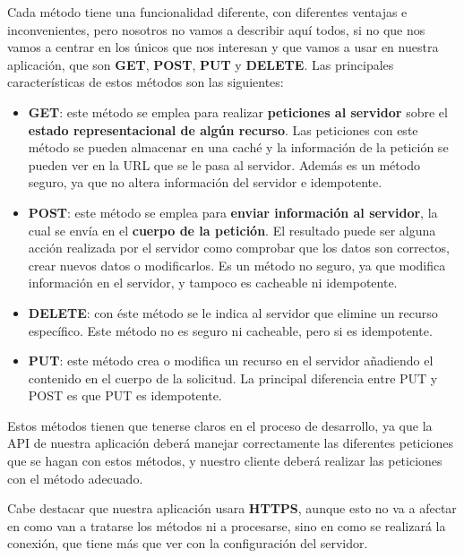 Cada método tiene una funcionalidad diferente, con diferentes ventajas e inconvenientes, pero nosotros no vamos a describir aquí todos, si no que nos vamos a centrar en los únicos que nos interesan y que vamos a usar en nuestra aplicación, que son \textbf{GET}, \textbf{POST}, \textbf{PUT} y \textbf{DELETE}. Las principales características de estos métodos son las siguientes:

\begin{itemize}
	\item \textbf{GET}: este método se emplea para realizar \textbf{peticiones al servidor} sobre el \textbf{estado representacional de algún recurso}. Las peticiones con este método se pueden almacenar en una caché y la información de la petición se pueden ver en la URL que se le pasa al servidor. Además es un método seguro, ya que no altera información del servidor e \gls{idempotente}. \cite{mdn02}
	
	\item \textbf{POST}: este método se emplea para \textbf{enviar información al servidor}, la cual se envía en el \textbf{cuerpo de la petición}. El resultado puede ser alguna acción realizada por el servidor como comprobar que los datos son correctos, crear nuevos datos o modificarlos. Es un método no seguro, ya que modifica información en el servidor, y tampoco es cacheable ni idempotente. \cite{mdn03} 
	
	\item \textbf{DELETE}: con éste método se le indica al servidor que elimine un recurso específico. Este método no es seguro ni cacheable, pero si es idempotente. \cite{mdn04}
	
	\item \textbf{PUT}: este método crea o modifica un recurso en el servidor añadiendo el contenido en el cuerpo de la solicitud. La principal diferencia entre PUT y POST es que PUT es idempotente. \cite{mdn05}
\end{itemize}

Estos métodos tienen que tenerse claros en el proceso de desarrollo, ya que la \gls{API} de nuestra aplicación deberá manejar correctamente las diferentes peticiones que se hagan con estos métodos, y nuestro cliente deberá realizar las peticiones con el método adecuado. 

Cabe destacar que nuestra aplicación usara \textbf{HTTPS}, aunque esto no va a afectar en como van a tratarse los métodos ni a procesarse, sino en como se realizará la conexión, que tiene más que ver con la configuración del servidor.

